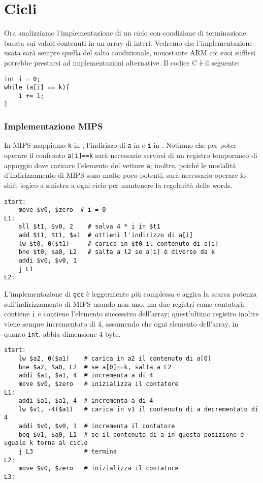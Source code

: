 \documentclass[class=book, crop=false, oneside]{standalone}
\begin{document}
\section{Cicli}
Ora analizziamo l'implementazione di un ciclo con condizione di terminazione basata sui valori contenuti in un array di interi. Vedremo che l'implementazione usata sarà sempre quella del salto condizionale, nonostante ARM coi suoi suffissi potrebbe prestarsi ad implementazioni alternative. Il codice C è il seguente:
\begin{verbatim}
int i = 0;
while (a[i] == k){
	i += 1;
}
\end{verbatim}

\subsubsection{Implementazione MIPS}
In MIPS mappiamo \texttt{k} in , l'indirizzo di \texttt{a} in  e \texttt{i} in . Notiamo che per poter operare il confronto \texttt{a[i]==k} sarà necessario servirsi di un registro temporaneo  di appoggio dove caricare l'elemento del vettore \texttt{a}; inoltre, poiché le modalità d'indirizzamento di MIPS sono molto poco potenti, sarà necessario operare lo shift logico a sinistra a ogni ciclo per mantenere la regolarità delle words.
\begin{verbatim}
start:
	move $v0, $zero	 # i = 0
L1:
	sll $t1, $v0, 2    # salva 4 * i in $t1
	add $t1, $t1, $a1  # ottieni l'indirizzo di a[i]
	lw $t0, 0($t1)     # carica in $t0 il contenuto di a[i]
	bne $t0, $a0, L2   # salta a l2 se a[i] è diverso da k
	addi $v0, $v0, 1
	j L1
L2:
\end{verbatim}

L'implementazione di \texttt{gcc} è leggermente più complessa e aggira la scarsa potenza sull'indirizzamento di MIPS usando non uno, ma due registri come contatori:   contiene \texttt{i} e  contiene l'elemento successivo dell'array; quest'ultimo registro inoltre viene sempre incrementato di 4, assumendo che ogni elemento dell'array, in quanto \texttt{int}, abbia dimensione 4 byte.
\begin{verbatim}
start:
	lw $a2, 0($a1)    # carica in a2 il contenuto di a[0]
	bne $a2, $a0, L2  # se a[0]==k, salta a L2
	addi $a1, $a1, 4  # incrementa a di 4
	move $v0, $zero   # inizializza il contatore
L1:
	addi $a1, $a1, 4  # incrementa a di 4
	lw $v1, -4($a1)   # carica in v1 il contenuto di a decrementato di 4
	addi $v0, $v0, 1  # incrementa il contatore
	beq $v1, $a0, L1  # se il contenuto di a in questa posizione è uguale k torna al ciclo
	j L3              # termina
L2:
	move $v0, $zero   # inizializza il contatore
L3:
\end{verbatim}
\end{document}
